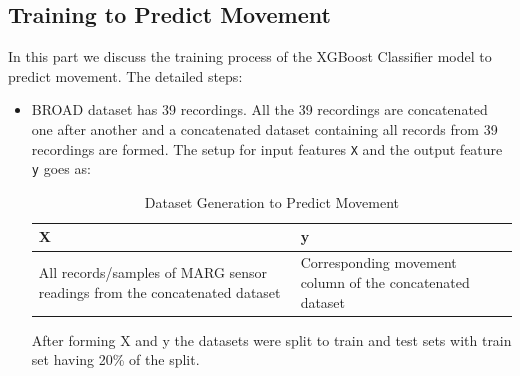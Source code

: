 \documentclass{iutbscthesis}
\begin{document}
\subsection{Training to Predict Movement}
In this part we discuss the training process of the XGBoost Classifier model to predict movement. The detailed steps:
\begin{itemize}
    \item BROAD dataset has 39 recordings. All the 39 recordings are concatenated one after another and a concatenated dataset containing all records from 39 recordings are formed. The setup for input features \verb|X| and the output feature \verb|y| goes as: \\
    \begin{table}[htbp]
    \centering
    \caption{Dataset Generation to Predict Movement}    \label{tab:sensor_readings}
        \begin{adjustbox}{max width=0.8\textwidth}
            \begin{tabular}{| p{} | p{} |}
            \hline
            \textbf{X} & \textbf{y} \\
            \hline
            All records/samples of MARG sensor readings from the concatenated dataset & Corresponding movement column of the concatenated dataset \\
            \hline
            \end{tabular}
        \end{adjustbox}
    \end{table}
    After forming X and y the datasets were split to train and test sets with train set having 20\% of the split.


\end{itemize}
\end{document}
